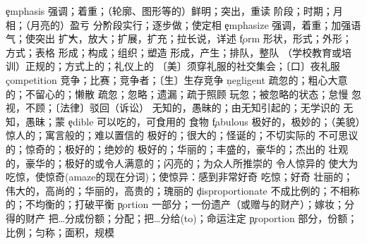 \begin{multicols}{2}
\c{emphasis}  \n 强调；着重；（轮廓、图形等的）鲜明；突出，重读 
  \n 阶段；时期；月相；（月亮的）盈亏 \v 分阶段实行；逐步做；使定相
\c{emphasize}  \vt 强调，着重；加强语气；使突出
  \v 扩大，放大；扩展，扩充；拉长说，详述
\c{form}  \n 形状，形式；外形；方式；表格 \vt 形成；构成；组织；塑造 \vi 形成，产生；排队，整队
  \a （学校教育或培训）正规的；方式上的；礼仪上的 \n 〔美〕须穿礼服的社交集会；〔口〕夜礼服
\c{competition}  \n 竞争；比赛；竞争者；〔生〕生存竞争
\c{negligent}  \a 疏忽的；粗心大意的；不留心的；懒散
  \vt 疏忽；忽略；遗漏；疏于照顾 \n 玩忽；被忽略的状态；怠慢
  \vt 忽视，不顾；〔法律〕驳回（诉讼）
  \a 无知的，愚昧的；由无知引起的；无学识的
  \n 无知，愚昧；蒙
\c{edible}  \a 可以吃的，可食用的 \n 食物
\c{fabulous}  \a 极好的，极妙的；（美貌）惊人的；寓言般的；难以置信的
  \a 极好的；很大的；怪诞的；不切实际的
  \a 不可思议的；惊奇的；极好的；绝妙的
  \a 极好的；华丽的；丰盛的，豪华的；杰出的
  \a 壮观的，豪华的；极好的或令人满意的；闪亮的；为众人所推崇的
  \a 令人惊异的 \vt 使大为吃惊，使惊奇(amaze的现在分词)；使惊异：感到非常好奇 \n 吃惊；好奇
  \a 壮丽的；伟大的，高尚的；华丽的，高贵的；瑰丽的
\c{disproportionate}  \a 不成比例的；不相称的；不均衡的；打破平衡
\c{portion}  \n 一部分；一份遗产（或赠与的财产）；嫁妆；分得的财产 \vt 把…分成份额；分配；把…分给(to)；命运注定
\c{proportion}  \n 部分，份额；比例；匀称；面积，规模



\end{multicols}
